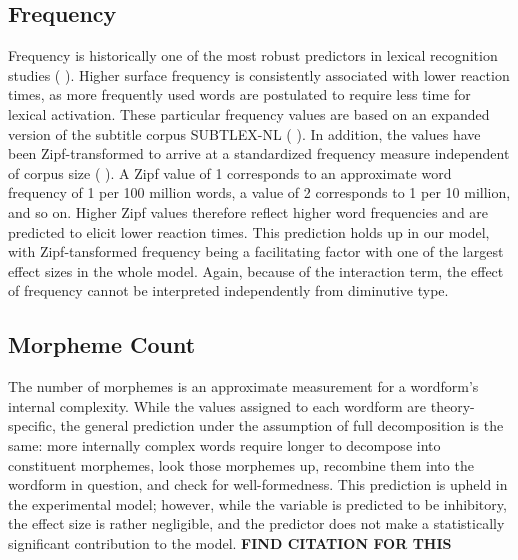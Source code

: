 \subsection{Frequency} \label{subsec:freq}
Frequency is historically one of the most robust predictors in lexical recognition studies (\citeauthor{Brysbaert+etal+2016} \citeyear{Brysbaert+etal+2016}). Higher surface frequency is consistently associated with lower reaction times, as more frequently used words are postulated to require less time for lexical activation. These particular frequency values are based on an expanded version of the subtitle corpus SUBTLEX-NL (\citeauthor{Keuleers+etal+2010a} \citeyear{Keuleers+etal+2010a}). In addition, the values have been Zipf-transformed to arrive at a standardized frequency measure independent of corpus size (\citeauthor{vanHeuven+etal+2014} \citeyear{vanHeuven+etal+2014}). A Zipf value of 1 corresponds to an approximate word frequency of 1 per 100 million words, a value of 2 corresponds to 1 per 10 million, and so on. Higher Zipf values therefore reflect higher word frequencies and are predicted to elicit lower reaction times. This prediction holds up in our model, with Zipf-tansformed frequency being a facilitating factor with one of the largest effect sizes in the whole model. Again, because of the interaction term, the effect of frequency cannot be interpreted independently from diminutive type.
\subsection{Morpheme Count} \label{subsec:nmorph}
The number of morphemes is an approximate measurement for a wordform's internal complexity. While the values assigned to each wordform are theory-specific, the general prediction under the assumption of full decomposition is the same: more internally complex words require longer to decompose into constituent morphemes, look those morphemes up, recombine them into the wordform in question, and check for well-formedness. This prediction is upheld in the experimental model; however, while the variable is predicted to be inhibitory, the effect size is rather negligible, and the predictor does not make a statistically significant contribution to the model. \textbf{FIND CITATION FOR THIS}
